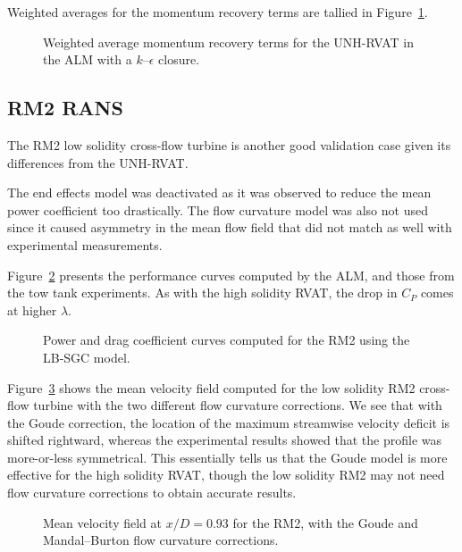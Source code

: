 Weighted averages for the momentum recovery terms are tallied in
Figure~\ref{fig:RVAT-ALM-recovery}.

\begin{figure}
    \caption{Weighted average momentum recovery terms for the UNH-RVAT in the
        ALM with a $k$--$\epsilon$ closure.}
    
    \label{fig:RVAT-ALM-recovery}
\end{figure}


\subsection{RM2 RANS}

The RM2 low solidity cross-flow turbine is another good validation case given
its differences from the UNH-RVAT.

The end effects model was deactivated as it was observed to reduce the mean
power coefficient too drastically. The flow curvature model was also not used
since it caused asymmetry in the mean flow field that did not match as well with
experimental measurements.


Figure~\ref{fig:RM2-ALM-perf-curves} presents
the performance curves computed by the ALM, and those from the tow tank
experiments. As with the high solidity RVAT, the drop in $C_P$ comes at higher
$\lambda$.

\begin{figure}
    \caption{Power and drag coefficient curves computed for the RM2 using the
        LB-SGC model.}
    
    \label{fig:RM2-ALM-perf-curves}
\end{figure}

Figure~\ref{fig:RM2-ALM-flow-curvature} shows the mean velocity field computed
for the low solidity RM2 cross-flow turbine with the two different flow
curvature corrections. We see that with the Goude correction, the location of
the maximum streamwise velocity deficit is shifted rightward, whereas the
experimental results showed that the profile was more-or-less symmetrical. This
essentially tells us that the Goude model is more effective for the high
solidity RVAT, though the low solidity RM2 may not need flow curvature
corrections to obtain accurate results.

\begin{figure}
    \caption{Mean velocity field at $x/D=0.93$ for the RM2, with the Goude and
        Mandal--Burton flow curvature corrections.}
    
    \label{fig:RM2-ALM-flow-curvature}
\end{figure}


